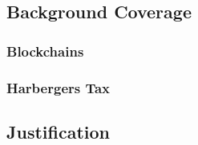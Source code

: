 \subsection{Background Coverage}


\subsubsection{Blockchains}




\subsubsection{Harbergers Tax}

\subsection{Justification} %

